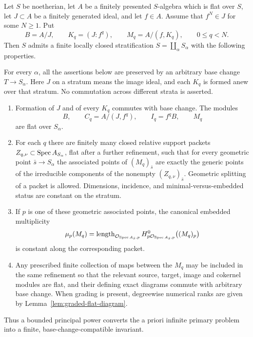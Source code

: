 \begin{theorem}
\label{thm:bounded-principal-colon-stratification}
Let \(S\) be noetherian, let \(A\) be a finitely presented
\(S\)-algebra which is flat over \(S\), let \(J\subset A\) be a
finitely generated ideal, and let \(f\in A\).  Assume that
\(f^N\in J\) for some \(N\ge1\).  Put
\[
 B=A/J,\qquad
 K_q=(J:f^q),\qquad
 M_q=A/(f,K_q),\qquad 0\le q<N.
\]
Then \(S\) admits a finite locally closed stratification
\(S=\coprod_\alpha S_\alpha\) with the following properties.

For every \(\alpha\), all the assertions below are preserved by an
arbitrary base change \(T\to S_\alpha\).  Here \(J\) on a stratum
means the image ideal, and each \(K_q\) is formed anew over that stratum.
No commutation across different strata is asserted.
\begin{enumerate}
\item Formation of \(J\) and of every \(K_q\) commutes with base
change.  The modules
\[
 B,\qquad C_q=A/(J,f^q),\qquad
 I_q=f^qB,\qquad M_q
\]
are flat over \(S_\alpha\).
\item For each \(q\) there are finitely many closed relative support
packets \(Z_{q,\nu}\subset\operatorname{Spec} A_{S_\alpha}\), flat after a further
refinement, such that for every geometric point \(\bar s\to S_\alpha\)
the associated points of \((M_q)_{\bar s}\) are exactly the generic
points of the irreducible components of the nonempty
\((Z_{q,\nu})_{\bar s}\).  Geometric splitting of a packet is allowed.
Dimensions, incidence, and minimal-versus-embedded status are constant
on the stratum.
\item If \(p\) is one of these geometric associated points, the
canonical embedded multiplicity
\[
 \mu_p(M_q)=
 \operatorname{length}_{\mathcal O_{\operatorname{Spec} A_{\bar s},p}}
 H^0_{p\mathcal O_{\operatorname{Spec} A_{\bar s},p}}\bigl((M_q)_p\bigr)
\]
is constant along the corresponding packet.
\item Any prescribed finite collection of maps between the \(M_q\)
may be included in the same refinement so that the relevant source,
target, image and cokernel modules are flat, and their defining exact
diagrams commute with arbitrary base change.  When grading is present,
degreewise numerical ranks are given by Lemma~\ref{lem:graded-flat-diagram}.
\end{enumerate}
Thus a bounded principal power converts the a priori infinite
primary problem into a finite, base-change-compatible invariant.
\end{theorem}


